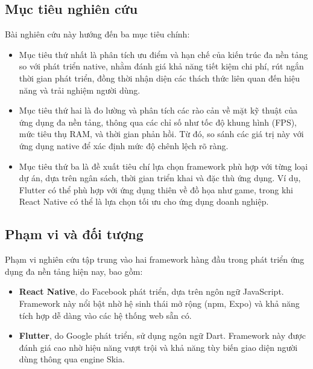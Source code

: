 % 
\subsection{Mục tiêu nghiên cứu}
\renewcommand{\labelitemi}{--}    
\begin{flushleft}
    \hspace*{0.8cm}Bài nghiên cứu này hướng đến ba mục tiêu chính:
    \setlength{\leftmargini}{1.0cm}
    \begin{itemize}
        \item Mục tiêu thứ nhất là phân tích ưu điểm và hạn chế của kiến trúc đa nền tảng so với phát triển native, nhằm đánh giá khả năng tiết kiệm chi phí, rút ngắn thời gian phát triển, đồng thời nhận diện các thách thức liên quan đến hiệu năng và trải nghiệm người dùng.
        
        \item Mục tiêu thứ hai là đo lường và phân tích các rào cản về mặt kỹ thuật của ứng dụng đa nền tảng, thông qua các chỉ số như tốc độ khung hình (FPS), mức tiêu thụ RAM, và thời gian phản hồi. Từ đó, so sánh các giá trị này với ứng dụng native để xác định mức độ chênh lệch rõ ràng.
        
        \item Mục tiêu thứ ba là đề xuất tiêu chí lựa chọn framework phù hợp với từng loại dự án, dựa trên ngân sách, thời gian triển khai và đặc thù ứng dụng. Ví dụ, Flutter có thể phù hợp với ứng dụng thiên về đồ họa như game, trong khi React Native có thể là lựa chọn tối ưu cho ứng dụng doanh nghiệp.
    \end{itemize}
\end{flushleft}

\subsection{Phạm vi và đối tượng}
\renewcommand{\labelitemi}{--}    
\begin{flushleft}
    \hspace*{0.8cm}Phạm vi nghiên cứu tập trung vào hai framework hàng đầu trong phát triển ứng dụng đa nền tảng hiện nay, bao gồm:
    \setlength{\leftmargini}{1.0cm}
    \begin{itemize}
        \item \textbf{React Native}, do Facebook phát triển, dựa trên ngôn ngữ JavaScript. Framework này nổi bật nhờ hệ sinh thái mở rộng (npm, Expo) và khả năng tích hợp dễ dàng vào các hệ thống web sẵn có.

        \item \textbf{Flutter}, do Google phát triển, sử dụng ngôn ngữ Dart. Framework này được đánh giá cao nhờ hiệu năng vượt trội và khả năng tùy biến giao diện người dùng thông qua engine Skia.
    \end{itemize}
\end{flushleft}

